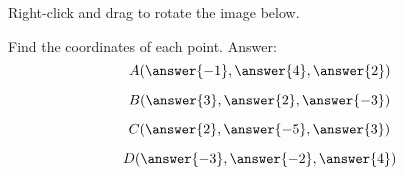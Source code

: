 \documentclass{ximera}
\begin{document}
\begin{problem}\label{prob:geogebrapts}
Right-click and drag to rotate the image below.  
\begin{center} 
\end{center}
Find the coordinates of each point.
Answer:
  $$A(\answer{-1}, \answer{4}, \answer{2})$$
 
  $$B(\answer{3}, \answer{2}, \answer{-3})$$

  $$C(\answer{2}, \answer{-5}, \answer{3})$$
  
  $$D(\answer{-3}, \answer{-2}, \answer{4})$$

\end{problem}
\end{document}
